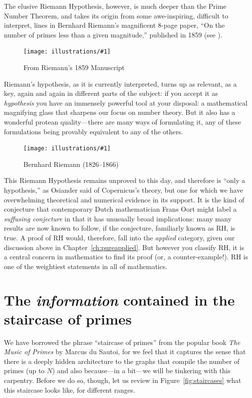 \documentclass[openany]{book}
\newcommand{\ill}[3]{%
   \begin{figure}[H]%
   \vspace{-2ex}
   \centering%
   \texttt{[image: illustrations/\#1]}%
   \caption{#3}%
   \vspace{-2ex}
    \end{figure}}
\theoremstyle{plain}
\theoremstyle{definition}
\newcommand{\RH}{Riemann Hypothesis\index{Riemann Hypothesis}}
\begin{document}
The elusive \RH{}, however, is much deeper than the Prime
Number Theorem, and takes its origin from some awe-inspiring,
difficult to interpret, lines in Bernhard Riemann's magnificent 8-page
paper, ``On the number of primes less than a given magnitude,''
published in 1859
(see ).


\ill{riemann_zoom}{1}{From Riemann's 1859 Manuscript\label{fig:riemamn}}




Riemann's hypothesis, as it is currently interpreted, turns up as
relevant, as a key, again and again in different parts of the subject:
if you accept it as {\em hypothesis} you have an immensely powerful
tool at your disposal: a mathematical magnifying glass that sharpens
our focus on number theory. But it also has a wonderful protean
quality---there are many ways of formulating it, any of these
formulations being provably equivalent to any of the others.

\ill{riemann}{.3}{Bernhard Riemann (1826--1866)}


This \RH{} remains unproved to this day, and therefore is ``only a
hypothesis,'' as Osiander said of Copernicus's theory, but one for
which we have overwhelming theoretical and numerical evidence in its
support.  It is the kind of conjecture that contemporary Dutch
mathematician Frans Oort might label a {\em suffusing conjecture} in
that it has unusually broad implications: many many results are now
known to follow, if the conjecture, familiarly known as RH, is true.
A proof of RH would, therefore, fall into the {\em applied} category,
given our discussion above in Chapter~\ref{ch:pureapplied}.  But
however you classify RH, it is a central concern in mathematics to
find its proof (or, a counter-example!).  RH is one of the weightiest
statements in all of mathematics.


\chapter[The staircase of primes]{The {\em information} contained in the staircase of primes\label{sec:information}}



We have borrowed the phrase ``staircase of primes'' from the popular
book {\em The Music of Primes} by Marcus du Sautoi, for we feel that
it captures the sense that there is a deeply hidden architecture to
the graphs that compile the number of primes (up to $N$) and also
because---in a bit---we will be tinkering with this carpentry.  Before
we do so, though, let us review in Figure~\ref{fig:staircases}
what this staircase looks like, for
different ranges.
\end{document}

